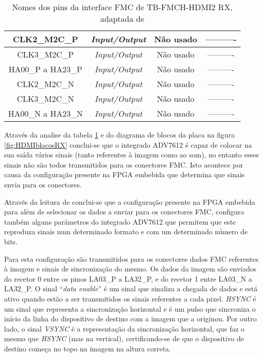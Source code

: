 \begin{table}[h!]
\begin{tabular}{|c|c|c|c|}
			CLK2\_M2C\_P         & \textit{Input/Output}          & Não usado              & ----------                     \\ \hline
			CLK3\_M2C\_P         & \textit{Input/Output}          & Não usado              & ----------                     \\ \hline
			HA00\_P a HA23\_P    & \textit{Input/Output}          & Não usado              & ----------                     \\ \hline
			CLK2\_M2C\_N         & \textit{Input/Output}          & Não usado              & ----------                     \\ \hline
			CLK3\_M2C\_N         & \textit{Input/Output}          & Não usado              & ----------                     \\ \hline
			HA00\_N a HA23\_N    & \textit{Input/Output}          & Não usado              & ----------                     \\ \hline
		\end{tabular}
		\centering
		\caption{Nomes dos pins da interface FMC de TB-FMCH-HDMI2 RX, adaptada de \cite{R009}}
		\label{table:HDMIdataRX}
	\end{table}

Através da analise da tabela \ref{table:HDMIdataRX} e do diagrama de blocos da placa na figura \ref{fig:HDMIblocosRX} conclui-se que o integrado ADV7612 é capaz de colocar na sua saída vários sinais (tanto referentes à imagem como ao som), no entanto esses sinais não são todos transmitidos para os conectores FMC. Isto acontece por causa da configuração presente na FPGA embebida que determina que sinais envia para os conectores. 

Através da leitura de \cite{R016} conclui-se que a configuração presente na FPGA embebida para além de selecionar os dados a enviar para os conectores FMC, configura também alguns parâmetros do integrado ADV7612 que permitem que este reproduza sinais num determinado formato e com um determinado número de bits. 

Para esta configuração são transmitidos para os conectores dados FMC referentes à imagem e sinais de sincronização do mesmo. Os dados da imagem são enviados do recetor 0 entre os pinos LA03\_P a LA32\_P, e do recetor 1  entre LA03\_N a LA32\_P. O sinal “\textit{data enable}” é um sinal que sinaliza a chegada de dados e está ativo quando estão a ser transmitidos os sinais referentes a cada pixel. \textit{HSYNC} é um sinal que representa a sincronização horizontal e é um pulso que sincroniza o início da linha do dispositivo de destino com a imagem que a originou. Por outro lado, o sinal \textit{VSYNC} é a representação da sincronização horizontal, que faz o mesmo que \textit{HSYNC} (mas na vertical), certificando-se de que o dispositivo de destino começa no topo na imagem na altura correta.

